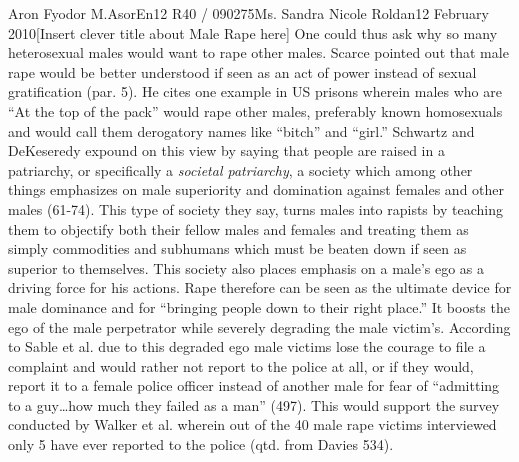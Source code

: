 \documentclass[12pt,letterpaper]{article}
\begin{document}
\begin{mla}{Aron Fyodor M.}{Asor}{En12 R40 / 090275}{Ms. Sandra Nicole Roldan}{12 February 2010}{[Insert clever title about Male Rape here]}
%
%
One could thus ask why so many heterosexual males would want to rape other males. Scarce pointed out that male rape would be better understood if seen as an act of power instead of sexual gratification (par. 5). He cites one example in US prisons wherein males who are ``At the top of the pack'' would rape other males, preferably known homosexuals and would call them derogatory names like ``bitch'' and ``girl.'' Schwartz and DeKeseredy expound on this view by saying that people are raised in a patriarchy, or specifically a \textit{societal patriarchy}, a society which among other things emphasizes on male superiority and domination against females and other males (61-74). This type of society they say, turns males into rapists by teaching them to objectify both their fellow males and females and treating them as simply commodities and subhumans which must be beaten down if seen as superior to themselves. This society also places emphasis on a male's ego as a driving force for his actions. Rape therefore can be seen as the ultimate device for male dominance and for ``bringing people down to their right place.'' It boosts the ego of the male perpetrator while severely degrading the male victim's. According to Sable et al. due to this degraded ego male victims lose the courage to file a complaint and would rather not report to the police at all, or if they would, report it to a female police officer instead of another male for fear of ``admitting to a guy\ldots how much they failed as a man'' (497). This would support the survey conducted by Walker et al. wherein out of the 40 male rape victims interviewed only 5 have ever reported to the police (qtd. from Davies 534).
%
%









\end{mla}
\end{document}
